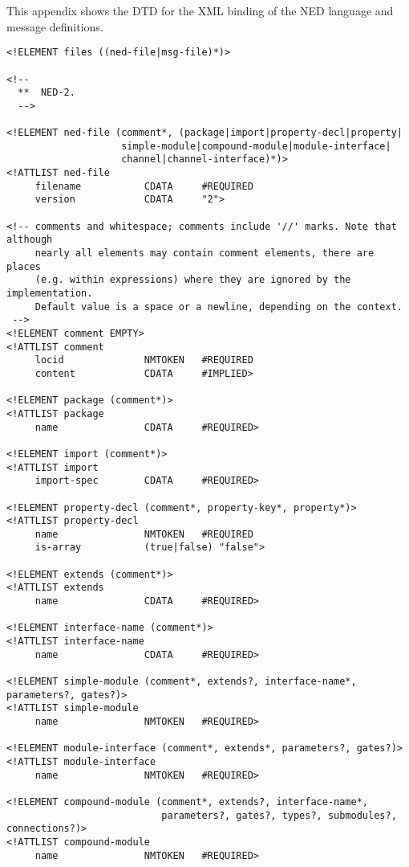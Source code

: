 \label{cha:ned-xml-binding}

This appendix shows the DTD for the XML binding of the NED language and
message definitions.


\begin{verbatim}
<!ELEMENT files ((ned-file|msg-file)*)>

<!--
  **  NED-2.
  -->

<!ELEMENT ned-file (comment*, (package|import|property-decl|property|
                    simple-module|compound-module|module-interface|
                    channel|channel-interface)*)>
<!ATTLIST ned-file
     filename           CDATA     #REQUIRED
     version            CDATA     "2">

<!-- comments and whitespace; comments include '//' marks. Note that although
     nearly all elements may contain comment elements, there are places
     (e.g. within expressions) where they are ignored by the implementation.
     Default value is a space or a newline, depending on the context.
 -->
<!ELEMENT comment EMPTY>
<!ATTLIST comment
     locid              NMTOKEN   #REQUIRED
     content            CDATA     #IMPLIED>

<!ELEMENT package (comment*)>
<!ATTLIST package
     name               CDATA     #REQUIRED>

<!ELEMENT import (comment*)>
<!ATTLIST import
     import-spec        CDATA     #REQUIRED>

<!ELEMENT property-decl (comment*, property-key*, property*)>
<!ATTLIST property-decl
     name               NMTOKEN   #REQUIRED
     is-array           (true|false) "false">

<!ELEMENT extends (comment*)>
<!ATTLIST extends
     name               CDATA     #REQUIRED>

<!ELEMENT interface-name (comment*)>
<!ATTLIST interface-name
     name               CDATA     #REQUIRED>

<!ELEMENT simple-module (comment*, extends?, interface-name*, parameters?, gates?)>
<!ATTLIST simple-module
     name               NMTOKEN   #REQUIRED>

<!ELEMENT module-interface (comment*, extends*, parameters?, gates?)>
<!ATTLIST module-interface
     name               NMTOKEN   #REQUIRED>

<!ELEMENT compound-module (comment*, extends?, interface-name*,
                           parameters?, gates?, types?, submodules?, connections?)>
<!ATTLIST compound-module
     name               NMTOKEN   #REQUIRED>


\end{verbatim}

